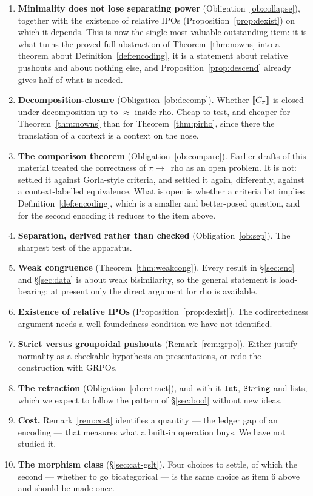 \documentclass{article}
\begin{document}
\begin{enumerate}
    \item \textbf{Minimality does not lose separating power} (Obligation~\ref{ob:collapse}), together with the existence of relative IPOs (Proposition~\ref{prop:dexist}) on which it depends. This is now the single most valuable outstanding item: it is what turns the proved full abstraction of Theorem~\ref{thm:nowns} into a theorem about Definition~\ref{def:encoding}, it is a statement about relative pushouts and about nothing else, and Proposition~\ref{prop:descend} already gives half of what is needed.
    \item \textbf{Decomposition-closure} (Obligation~\ref{ob:decomp}). Whether $[\![C_\pi]\!]$ is closed under decomposition up to $\approx$ inside rho. Cheap to test, and cheaper for Theorem~\ref{thm:nowns} than for Theorem~\ref{thm:pirho}, since there the translation of a context is a context on the nose.
    \item \textbf{The comparison theorem} (Obligation~\ref{ob:compare}). Earlier drafts of this material treated the correctness of $\pi\to$~rho as an open problem. It is not: \citet{lybech} settled it against Gorla-style criteria, and \citet{nowns} settled it again, differently, against a context-labelled equivalence. What is open is whether a criteria list implies Definition~\ref{def:encoding}, which is a smaller and better-posed question, and for the second encoding it reduces to the item above.
    \item \textbf{Separation, derived rather than checked} (Obligation~\ref{ob:sep}). The sharpest test of the apparatus.
    \item \textbf{Weak congruence} (Theorem~\ref{thm:weakcong}). Every result in \S\ref{sec:enc} and \S\ref{sec:data} is about weak bisimilarity, so the general statement is load-bearing; at present only the direct argument for rho is available.
    \item \textbf{Existence of relative IPOs} (Proposition~\ref{prop:dexist}). The codirectedness argument needs a well-foundedness condition we have not identified.
    \item \textbf{Strict versus groupoidal pushouts} (Remark~\ref{rem:grpo}). Either justify normality as a checkable hypothesis on presentations, or redo the construction with GRPOs.
    \item \textbf{The retraction} (Obligation~\ref{ob:retract}), and with it $\mathtt{Int}$, $\mathtt{String}$ and lists, which we expect to follow the pattern of \S\ref{sec:bool} without new ideas.
    \item \textbf{Cost.} Remark~\ref{rem:cost} identifies a quantity --- the ledger gap of an encoding --- that measures what a built-in operation buys. We have not studied it.
    \item \textbf{The morphism class} (\S\ref{sec:cat-gslt}). Four choices to settle, of which the second --- whether to go bicategorical --- is the same choice as item 6 above and should be made once.
\end{enumerate}
\end{document}
